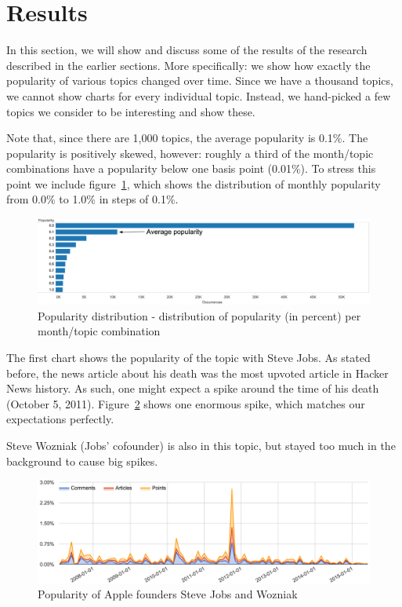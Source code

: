 \section{Results}
\label{sec:results}
In this section, we will show and discuss some of the results of the research described in the earlier sections. More specifically: we show how exactly the popularity of various topics changed over time. Since we have a thousand topics, we cannot show charts for every individual topic. Instead, we hand-picked a few topics we consider to be interesting and show these. 

Note that, since there are 1,000 topics, the average popularity is 0.1\%. The popularity is positively skewed, however: roughly a third of the month/topic combinations have a popularity below one basis point (0.01\%). To stress this point we include figure~\ref{fig:popularitydistribution}, which shows the distribution of monthly popularity from 0.0\% to 1.0\% in steps of 0.1\%.

\begin{figure}[H]
	\caption{Popularity distribution - distribution of popularity (in percent) per month/topic combination}
	\label{fig:popularitydistribution}
	\centering
	\includegraphics[width=14cm]{popularity_distribution}
\end{figure}
\pagebreak
The first chart shows the popularity of the topic with Steve Jobs. As stated before, the news article about his death was the most upvoted article in Hacker News history. As such, one might expect a spike around the time of his death (October 5, 2011). Figure~\ref{fig:trend_jobs} shows one enormous spike, which matches our expectations perfectly.

Steve Wozniak (Jobs' cofounder) is also in this topic, but stayed too much in the background to cause big spikes.
\begin{figure}[H] %
	\caption{Popularity of Apple founders Steve Jobs and Wozniak}
	\label{fig:trend_jobs}
	\centering
	\includegraphics[width=14cm]{topic_trends/jobs_relative}
\end{figure}

